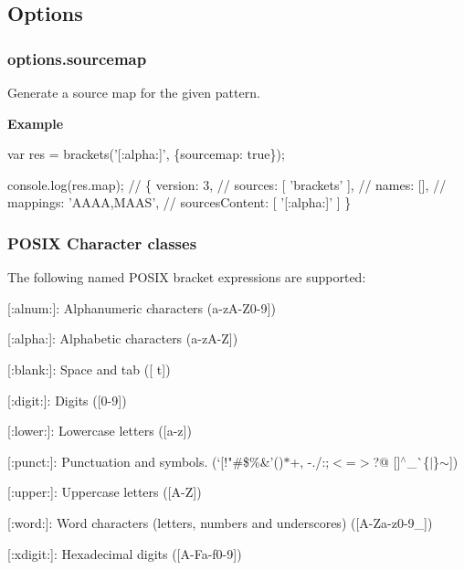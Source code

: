 \subsection*{Options}

\subsubsection*{options.\+sourcemap}

Generate a source map for the given pattern.

{\bfseries Example}


\begin{DoxyCode}
var res = brackets('[:alpha:]', \{sourcemap: true\});

console.log(res.map);
// \{ version: 3,
//   sources: [ 'brackets' ],
//   names: [],
//   mappings: 'AAAA,MAAS',
//   sourcesContent: [ '[:alpha:]' ] \}
\end{DoxyCode}


\subsubsection*{P\+O\+S\+IX Character classes}

The following named P\+O\+S\+IX bracket expressions are supported\+:


\begin{DoxyItemize}
\item {\ttfamily \mbox{[}\+:alnum\+:\mbox{]}}\+: Alphanumeric characters ({\ttfamily a-\/z\+A-\/\+Z0-\/9\mbox{]}})
\item {\ttfamily \mbox{[}\+:alpha\+:\mbox{]}}\+: Alphabetic characters ({\ttfamily a-\/z\+A-\/Z\mbox{]}})
\item {\ttfamily \mbox{[}\+:blank\+:\mbox{]}}\+: Space and tab ({\ttfamily \mbox{[} t\mbox{]}})
\item {\ttfamily \mbox{[}\+:digit\+:\mbox{]}}\+: Digits ({\ttfamily \mbox{[}0-\/9\mbox{]}})
\item {\ttfamily \mbox{[}\+:lower\+:\mbox{]}}\+: Lowercase letters ({\ttfamily \mbox{[}a-\/z\mbox{]}})
\item {\ttfamily \mbox{[}\+:punct\+:\mbox{]}}\+: Punctuation and symbols. (`\mbox{[}!"\#\$\%\&'()$\ast$+, -\/./\+:;$<$=$>$?@ \mbox{[}\mbox{]}$^\wedge$\+\_\+\`{}{\ttfamily \{$\vert$\}$\sim$\mbox{]}})
\item {\ttfamily \mbox{[}\+:upper\+:\mbox{]}}\+: Uppercase letters ({\ttfamily \mbox{[}A-\/Z\mbox{]}})
\item {\ttfamily \mbox{[}\+:word\+:\mbox{]}}\+: Word characters (letters, numbers and underscores) ({\ttfamily \mbox{[}A-\/\+Za-\/z0-\/9\+\_\+\mbox{]}})
\item {\ttfamily \mbox{[}\+:xdigit\+:\mbox{]}}\+: Hexadecimal digits ({\ttfamily \mbox{[}A-\/\+Fa-\/f0-\/9\mbox{]}})
\end{DoxyItemize}

